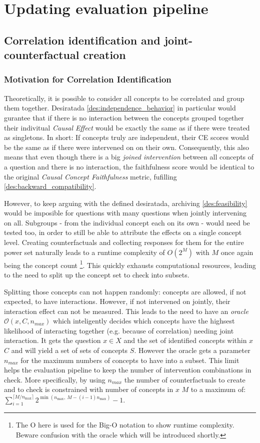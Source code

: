 \section{Updating evaluation pipeline}
\subsection{Correlation identification and joint-counterfactual creation}
\label{sec:joint_counterfactual}
\subsubsection{Motivation for Correlation Identification}
Theoretically, it is possible to consider all concepts to be correlated and group them together. Desiratada \ref{des:independence_behavior} in particular would gurantee that if there is no interaction between the concepts grouped together their indivitual \emph{Causal Effect} would be exactly the same as if there were treated as singletons. In short: If concepts truly are independent, their CE scores would be the same as if there were intervened on on their own. Consequently, this also means that even though there is a big \emph{joined intervention} between all concepts of a question and there is no interaction, the faithfulness score would be identical to the original \emph{Causal Concept Faithfulness} metric, fufilling \ref{des:backward_compatibility}.

However, to keep arguing with the defined desiratada, archiving \ref{des:feasibility} would be imposible for questions with many questions when jointly intervening on all. Subgroups - from the individual concept each on its own - would need be tested too, in order to still be able to attribute the effects on a single concept level. Creating counterfactuals and collecting responses for them for the entire power set naturally leads to a runtime complexity of $O(2^M)$ with $M$ once again being the concept count \footnote{The O here is used for the Big-O notation to show runtime complexity. Beware confusion with the oracle which will be introduced shortly.}. This quickly exhausts computational resources, leading to the need to split up the concept set to check into subsets.

Splitting those concepts can not happen randomly: concepts are allowed, if not expected, to have interactions. However, if not intervened on jointly, their interaction effect can not be measured. This leads to the need to have an \emph{oracle} $\mathcal{O}(x, C, n_{max})$ which inteligently decides which concepts have the highsest likelihood of interacting together (e.g. because of correlation) needing joint interaction. It gets the question $x \in X$ and the set of identified concepts within $x$ $C$ and will yield a set of sets of concepts $S$. However the oracle gets a parameter $n_{max}$ for the maximum numbers of concepts to have into a subset. This limit helps the evaluation pipeline to keep the number of intervention combinations in check. More specifically, by using $n_{max}$ the number of counterfactuals to create and to check is constrained with number of concepts in $x$ $M$ to a maximum of: $\sum_{i=1}^{\lceil M/n_{\max} \rceil} 2^{\min(n_{\max},\ M - (i-1)n_{\max})} - 1$.

